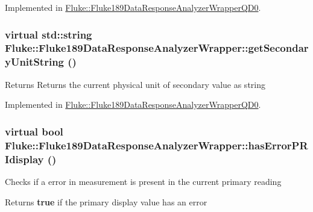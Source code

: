 Implemented in \hyperlink{classFluke_1_1Fluke189DataResponseAnalyzerWrapperQD0_a95eb5efb6652935a968b6063b6ae59ad}{Fluke::Fluke189DataResponseAnalyzerWrapperQD0}.\hypertarget{classFluke_1_1Fluke189DataResponseAnalyzerWrapper_ae8fa175a376f000e0ccebef46b0f6cc2}{
\subsubsection[{getSecondaryUnitString}]{\setlength{\rightskip}{0pt plus 5cm}virtual std::string Fluke::Fluke189DataResponseAnalyzerWrapper::getSecondaryUnitString ()}}
\label{classFluke_1_1Fluke189DataResponseAnalyzerWrapper_ae8fa175a376f000e0ccebef46b0f6cc2}
\begin{DoxyReturn}{Returns}
Returns the current physical unit of secondary value as string 
\end{DoxyReturn}


Implemented in \hyperlink{classFluke_1_1Fluke189DataResponseAnalyzerWrapperQD0_af504a28abc1a4a92a26daf1ccf79150f}{Fluke::Fluke189DataResponseAnalyzerWrapperQD0}.\hypertarget{classFluke_1_1Fluke189DataResponseAnalyzerWrapper_a25ca42185c5573fb30a6c60e72c36e27}{
\subsubsection[{hasErrorPRIdisplay}]{\setlength{\rightskip}{0pt plus 5cm}virtual bool Fluke::Fluke189DataResponseAnalyzerWrapper::hasErrorPRIdisplay ()}}
\label{classFluke_1_1Fluke189DataResponseAnalyzerWrapper_a25ca42185c5573fb30a6c60e72c36e27}
Checks if a error in measurement is present in the current primary reading \begin{DoxyReturn}{Returns}
{\bfseries true} if the primary display value has an error 
\end{DoxyReturn}


